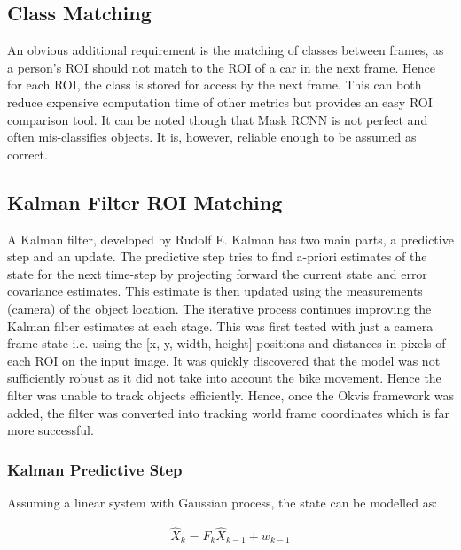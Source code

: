 \documentclass[11pt,twoside]{report}
\begin{document}
\subsection{Class Matching} \label{class_matching}
An obvious additional requirement is the matching of classes between frames, as a person's ROI should not match to the ROI of a car in the next frame. Hence for each ROI, the class is stored for access by the next frame. This can both reduce expensive computation time of other metrics but provides an easy ROI comparison tool. It can be noted though that Mask RCNN is not perfect and often mis-classifies objects. It is, however, reliable enough to be assumed as correct.

\subsection{Kalman Filter ROI Matching} \label{kalman_matching}

A Kalman filter, developed by Rudolf E. Kalman has two main parts, a predictive step and an update. The predictive step tries to find a-priori estimates of the state for the next time-step by projecting forward the current state and error covariance estimates. This estimate is then updated using the measurements (camera) of the object location. The iterative process continues improving the Kalman filter estimates at each stage. 
\newline \newline
This was first tested with just a camera frame state i.e. using the [x, y, width, height] positions and distances in pixels of each ROI on the input image. It was quickly discovered that the model was not sufficiently robust as it did not take into account the bike movement. Hence the filter was unable to track objects efficiently. Hence, once the Okvis framework was added, the filter was converted into tracking world frame coordinates which is far more successful.

\subsubsection{Kalman Predictive Step}
Assuming a linear system with Gaussian process, the state can be modelled as:

\begin{equation}
\begin{aligned}
\hat{X}_{k} =  F_{k} \hat{X}_{k-1} + w_{k-1}
\end{aligned}
\end{equation}
\end{document}
